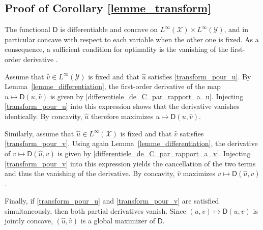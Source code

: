 \documentclass{article}
\begin{document}
\subsection{Proof of Corollary \ref{lemme_transform}}
\begin{IEEEproof}
The functional $\mathsf D$ is differentiable and concave on $L^\infty(\mathcal X)\times L^\infty(\mathcal Y)$, and in particular concave with respect to each variable when the other one is fixed. As a consequence, a sufficient condition for optimality is the vanishing of the first-order derivative \cite[Chapter~2.4]{convexanalysis}.

Assume that $\hat v\in L^\infty(\mathcal Y)$ is fixed and that $\hat u$ satisfies \eqref{transform_pour_u}. By Lemma~\ref{lemme_differentiation}, the first-order derivative of the map $u\mapsto \mathsf D(u,\hat v)$ is given by \eqref{differentiele_de_C_par_rapport_a_u}. Injecting \eqref{transform_pour_u} into this expression shows that the derivative vanishes identically. By concavity, $\hat u$ therefore maximizes $u\mapsto \mathsf D(u,\hat v)$.

Similarly, assume that $\hat u\in L^\infty(\mathcal X)$ is fixed and that $\hat v$ satisfies \eqref{transform_pour_v}. Using again Lemma~\ref{lemme_differentiation}, the derivative of $v\mapsto \mathsf D(\hat u,v)$ is given by \eqref{differentiele_de_C_par_rapport_a_v}. Injecting \eqref{transform_pour_v} into this expression yields the cancellation of the two terms and thus the vanishing of the derivative. By concavity, $\hat v$ maximizes $v\mapsto \mathsf D(\hat u,v)$.

Finally, if \eqref{transform_pour_u} and \eqref{transform_pour_v} are satisfied simultaneously, then both partial derivatives vanish. Since $(u,v)\mapsto \mathsf D(u,v)$ is jointly concave, $(\hat u,\hat v)$ is a global maximizer of $\mathsf D$.
\end{IEEEproof}
\end{document}

